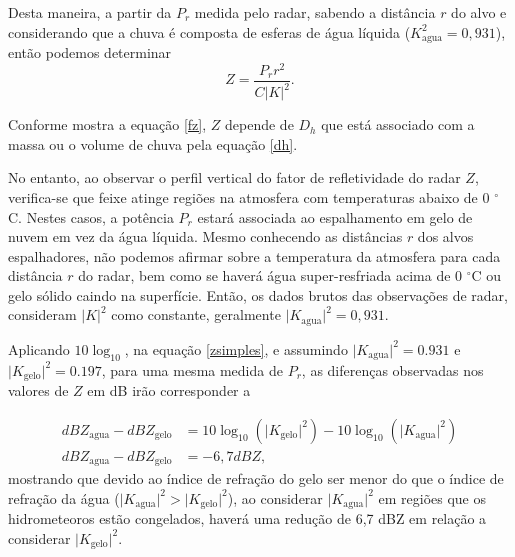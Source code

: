 Desta maneira, a partir da $P_r$ medida pelo radar, sabendo a distância $r$ do alvo e considerando que a chuva é composta de esferas de água líquida ($K_{\mathrm{agua}}^2=0,931$), então podemos determinar 
\begin{equation}
Z = \dfrac{P_r r^2}{C |K|^2}.
\label{zsimples}
\end{equation}

Conforme mostra a equação \ref{fz}, $Z$ depende de $D_h$ que está associado com a massa ou o volume de chuva pela equação \ref{dh}.


No entanto, ao observar o perfil vertical do fator de refletividade do radar $Z$, verifica-se que feixe atinge regiões na atmosfera com temperaturas abaixo de 0 $^{\circ}$C. Nestes casos, a potência $P_r$ estará associada ao espalhamento em gelo de nuvem em vez da água líquida. Mesmo conhecendo as distâncias $r$ dos alvos espalhadores, não podemos afirmar sobre a temperatura da atmosfera para cada distância $r$ do radar, bem como se haverá água super-resfriada acima de 0 $^{\circ}$C ou gelo sólido caindo na superfície. Então, os dados brutos das observações de radar, consideram $|K|^2$ como constante, geralmente $\vert K_{\mathrm{agua}}\vert^2 = 0,931$. 


Aplicando $10\log_{10}$, na equação \ref{zsimples}, e assumindo  $\vert K_{\mathrm{agua}}\vert^2 = 0.931$ e $\vert K_{\mathrm{gelo}}\vert^2= 0.197$, para uma mesma medida de $P_r$, as diferenças observadas nos valores de $Z$ em dB irão corresponder a

\begin{align}
dBZ_{\mathrm{agua}}-dBZ_{\mathrm{gelo}} &=  10\log_{10}(\vert K_{\mathrm{gelo}}\vert^2 ) - 10\log_{10}(\vert K_{\mathrm{agua}}\vert^2)\\
dBZ_{\mathrm{agua}}- dBZ_{\mathrm{gelo}} &= -6,7 dBZ,
\end{align}
mostrando que devido ao índice de refração do gelo ser menor do que o índice de refração da água ($\vert K_{\mathrm{agua}}\vert^2 > \vert K_{\mathrm{gelo}}\vert^2$), ao considerar $\vert K_{\mathrm{agua}}\vert^2$ em regiões que os hidrometeoros estão congelados, haverá uma redução de 6,7 dBZ em relação a considerar $\vert K_{\mathrm{gelo}}\vert^2$.  

